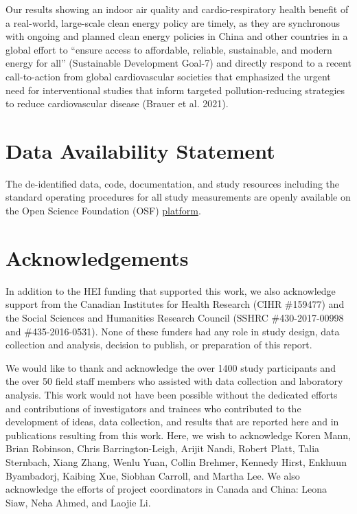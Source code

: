 \documentclass[
  letterpaper,
  DIV=11,
  numbers=noendperiod]{scrartcl}
\begin{document}
Our results showing an indoor air quality and cardio-respiratory health
benefit of a real-world, large-scale clean energy policy are timely, as
they are synchronous with ongoing and planned clean energy policies in
China and other countries in a global effort to ``ensure access to
affordable, reliable, sustainable, and modern energy for all''
(Sustainable Development Goal-7) and directly respond to a recent
call-to-action from global cardiovascular societies that emphasized the
urgent need for interventional studies that inform targeted
pollution-reducing strategies to reduce cardiovascular disease (Brauer
et al. 2021).

\section{Data Availability Statement}\label{data-availability-statement}

The de-identified data, code, documentation, and study resources
including the standard operating procedures for all study measurements
are openly available on the Open Science Foundation (OSF)
\href{https://osf.io/8twds/?view_only=c41dd3d6228240d6aad92f81371c5339}{platform}.

\section{Acknowledgements}\label{acknowledgements}

In addition to the HEI funding that supported this work, we also
acknowledge support from the Canadian Institutes for Health Research
(CIHR \#159477) and the Social Sciences and Humanities Research Council
(SSHRC \#430-2017-00998 and \#435-2016-0531). None of these funders had
any role in study design, data collection and analysis, decision to
publish, or preparation of this report.

We would like to thank and acknowledge the over 1400 study participants
and the over 50 field staff members who assisted with data collection
and laboratory analysis. This work would not have been possible without
the dedicated efforts and contributions of investigators and trainees
who contributed to the development of ideas, data collection, and
results that are reported here and in publications resulting from this
work. Here, we wish to acknowledge Koren Mann, Brian Robinson, Chris
Barrington-Leigh, Arijit Nandi, Robert Platt, Talia Sternbach, Xiang
Zhang, Wenlu Yuan, Collin Brehmer, Kennedy Hirst, Enkhuun Byambadorj,
Kaibing Xue, Siobhan Carroll, and Martha Lee. We also acknowledge the
efforts of project coordinators in Canada and China: Leona Siaw, Neha
Ahmed, and Laojie Li.
\end{document}
